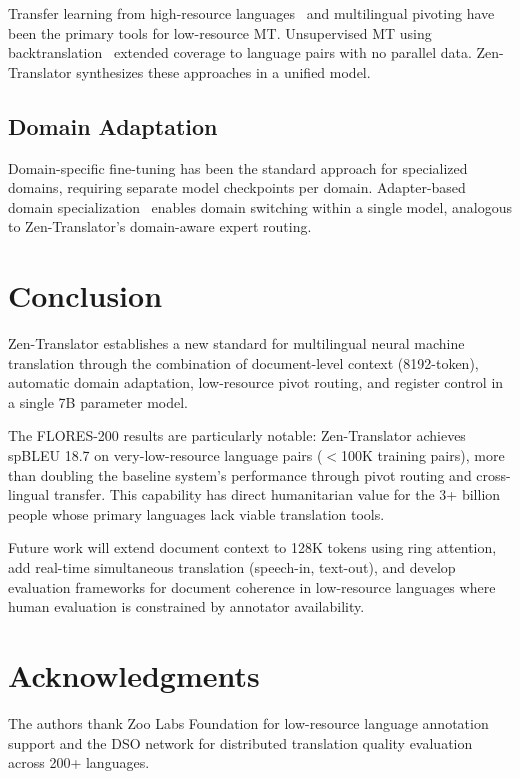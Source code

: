 \documentclass[11pt,a4paper]{article}
\begin{document}
Transfer learning from high-resource languages~\cite{zoph2016transfer} and multilingual
pivoting have been the primary tools for low-resource MT. Unsupervised MT using
backtranslation~\cite{lample2018phrase} extended coverage to language pairs with
no parallel data. Zen-Translator synthesizes these approaches in a unified model.

\subsection{Domain Adaptation}

Domain-specific fine-tuning has been the standard approach for specialized domains,
requiring separate model checkpoints per domain. Adapter-based domain specialization~\cite{adapters}
enables domain switching within a single model, analogous to Zen-Translator's
domain-aware expert routing.

\section{Conclusion}
\label{sec:conclusion}

Zen-Translator establishes a new standard for multilingual neural machine translation
through the combination of document-level context (8192-token), automatic domain adaptation,
low-resource pivot routing, and register control in a single 7B parameter model.

The FLORES-200 results are particularly notable: Zen-Translator achieves spBLEU 18.7
on very-low-resource language pairs ($<$100K training pairs), more than doubling the
baseline system's performance through pivot routing and cross-lingual transfer. This
capability has direct humanitarian value for the 3+ billion people whose primary
languages lack viable translation tools.

Future work will extend document context to 128K tokens using ring attention, add
real-time simultaneous translation (speech-in, text-out), and develop evaluation
frameworks for document coherence in low-resource languages where human evaluation
is constrained by annotator availability.

\section*{Acknowledgments}

The authors thank Zoo Labs Foundation for low-resource language annotation support
and the DSO network for distributed translation quality evaluation across 200+ languages.
\end{document}
